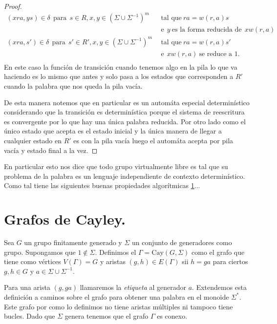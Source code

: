 \documentclass[tesis.tex]{subfiles}
\newcommand{\fg}{grupo finitamente generado }
\begin{document}
\begin{proof}
	\begin{align*}
	(xra,ys) \in \delta \ \ \text{para} \ \  s \in R, x,y \in (\Sigma \cup \Sigma^{-1})^m & \ \  \text{tal que} \ ra=w(r,a)s  \\ & \ \ \text{e} \ \ y \ \text{es la forma reducida de} \ \ xw(r,a)  \\
	(xra,s') \in \delta\ \ \text{para} \ \  s' \in R', x,y \in (\Sigma \cup \Sigma^{-1})^m & \ \  \text{tal que} \ ra=w(r,a)s'  \\ & \ \ \text{e}  \ \ xw(r,a)  \ \text{se reduce a 1}. \ \  \\ 
	\end{align*}
	En este caso la función de transición cuando tenemos algo en la pila lo que va haciendo es lo mismo que antes y solo pasa a los estados que corresponden a $R'$ cuando la palabra que nos queda la pila vacía. 
	
	De esta manera notemos que en particular es un automáta especial determinístico considerando que la transición es determinística porque el sistema de reescritura es convergente por lo que hay una única palabra reducida. 
	Por otro lado como el único estado que acepta es el estado inicial y la única manera de llegar a cualquier estado en $R'$ es con la pila vacía luego el automáta acepta por pila vacía y estado final a la vez.
\end{proof}

\begin{obs}
	En particular esto nos dice que todo grupo virtualmente libre es tal que su problema de la palabra es un lenguaje independiente de contexto determinístico. 
	Como tal tiene las siguientes buenas propiedades algorítmicas \ref{}...
\end{obs}


\section{Grafos de Cayley.}

\begin{deff}
	Sea $G$ un \fg y $\Sigma$ un conjunto de generadores como grupo. 
	Supongamos que $1 \notin \Sigma$.
	Definimos el  $\Gamma = \text{Cay}(G,\Sigma)$ como el grafo que tiene como vértices $V(\Gamma) = G$ y aristas $(g,h) \in E(\Gamma)$ sii $h=ga$ para ciertos $g,h \in G$ y $a \in \Sigma \cup \Sigma^{-1}$. 
\end{deff}

Para una arista $(g,ga)$ llamaremos la \emph{etiqueta} al generador $a$.
Extendemos esta definición a caminos sobre el grafo para obtener una palabra en el monoide $\Sigma^*$.
Este grafo por como lo definimos no tiene aristas múltiples ni tampoco tiene bucles.
Dado que $\Sigma$ genera tenemos que el grafo $\Gamma$ es conexo.
\end{document}
